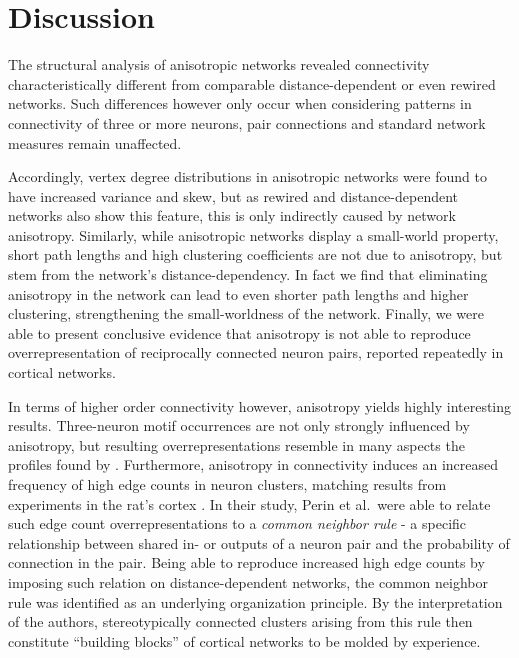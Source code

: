 

\section{Discussion}\label{sec:discussion}

The structural analysis of anisotropic networks revealed connectivity
characteristically different from comparable distance-dependent or
even rewired networks. Such differences however only occur when
considering patterns in connectivity of three or more neurons, pair
connections and standard network measures remain unaffected.

Accordingly, vertex degree distributions in anisotropic networks were
found to have increased variance and skew, but as rewired and
distance-dependent networks also show this feature, this is only
indirectly caused by network anisotropy. Similarly, while
an\-iso\-tro\-pic networks display a small-world property, short path
lengths and high clustering coefficients are not due to anisotropy,
but stem from the network's distance-dependency. In fact we find that
eliminating anisotropy in the network can lead to even shorter path
lengths and higher clustering, strengthening the small-worldness of
the network. Finally, we were able to present conclusive evidence that
anisotropy is not able to reproduce overrepresentation of reciprocally
connected neuron pairs, reported repeatedly in cortical networks.

In terms of higher order connectivity however, anisotropy yields
highly interesting results. Three-neuron motif occurrences are not
only strongly influenced by anisotropy, but resulting
overrepresentations resemble in many aspects the profiles found by
\textcite{Song2005}. Furthermore, anisotropy in connectivity induces
an increased frequency of high edge counts in neuron clusters,
matching results from experiments in the rat's
cortex \parencite{Perin2011}. In their study, Perin et al.\ were able
to relate such edge count overrepresentations to a \textit{common
  neighbor rule} - a specific relationship between shared in- or
outputs of a neuron pair and the probability of connection in the
pair. Being able to reproduce increased high edge counts by imposing
such relation on distance-dependent networks, the common neighbor rule
was identified as an underlying organization principle. By the
interpretation of the authors, stereotypically connected clusters
arising from this rule then constitute \enquote{building blocks} of
cortical networks to be molded by experience.

